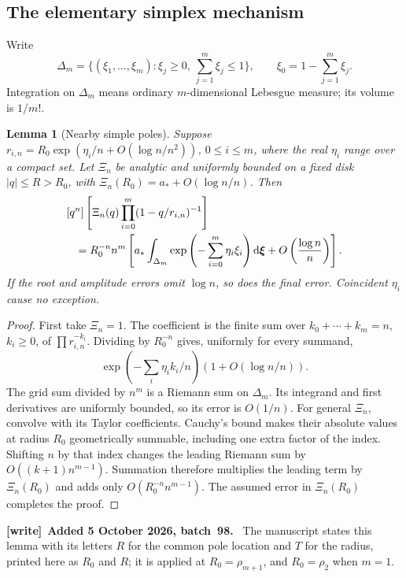 \documentclass[11pt,a4paper]{article}
\numberwithin{equation}{section}
\newtheorem{lemma}[theorem]{Lemma}
\theoremstyle{definition}\newtheorem{definition}[theorem]{Definition}
\theoremstyle{remark}\newtheorem{remark}[theorem]{Remark}
\newcommand{\coeff}[2]{[#1^{#2}]}
\newcommand{\dd}{\mathrm d}
\newenvironment{writenote}[1][]{\par\smallskip\begingroup\small
 \noindent\textbf{[write]}\if\relax\detokenize{#1}\relax\else~\textbf{#1.}\fi\ }%
 {\par\endgroup\smallskip}
\begin{document}
\subsection{The elementary simplex mechanism}
Write
\[
 \Delta_m=\{(\xi_1,\ldots,\xi_m):\xi_j\ge0,\ \textstyle\sum_{j=1}^m \xi_j\le1\},
 \qquad \xi_0=1-\sum_{j=1}^m \xi_j.
\]
Integration on $\Delta_m$ means ordinary $m$-dimensional Lebesgue measure;
its volume is $1/m!$.

\begin{lemma}[Nearby simple poles]\label{vmb:cw:lem:simplex}
Suppose $r_{i,n}=R_0\exp(\eta_i/n+O(\log n/n^2))$, $0\le i\le m$, where
the real $\eta_i$ range over a compact set. Let $\Xi_n$ be
analytic and uniformly bounded on a fixed disk $|q|\le R>R_0$, with
$\Xi_n(R_0)=a_*+O(\log n/n)$. Then
\begin{align}\label{vmb:cw:eq:simplexlemma}
 &\coeff qn\left[\Xi_n(q)\prod_{i=0}^{m}(1-q/r_{i,n})^{-1}\right]\notag\\
 &\hspace{8pt}=R_0^{-n}n^m\left[
 a_*\int_{\Delta_m}\exp\left(-\sum_{i=0}^{m}\eta_i \xi_i\right)\dd\bm \xi
 +O\left(\frac{\log n}{n}\right)\right].
\end{align}
If the root and amplitude errors omit $\log n$, so does the final error.
Coincident $\eta_i$ cause no exception.
\end{lemma}
\begin{proof}
First take $\Xi_n=1$. The coefficient is the finite sum over
$k_0+\cdots+k_m=n$, $k_i\ge0$, of $\prod r_{i,n}^{-k_i}$. Dividing by
$R_0^{-n}$ gives, uniformly for every summand,
\[
 \exp\left(-\sum_i\eta_i k_i/n\right)
 \left(1+O(\log n/n)\right).
\]
The grid sum divided by $n^m$ is a Riemann sum on $\Delta_m$. Its integrand
and first derivatives are uniformly bounded, so its error is $O(1/n)$.
For general $\Xi_n$, convolve with its Taylor coefficients. Cauchy's bound
makes their absolute values at radius $R_0$ geometrically summable, including
one extra factor of the index. Shifting $n$ by that index changes the leading
Riemann sum by $O((k+1)n^{m-1})$. Summation therefore multiplies the leading
term by $\Xi_n(R_0)$ and adds only $O(R_0^{-n}n^{m-1})$. The assumed error in
$\Xi_n(R_0)$ completes the proof.
\end{proof}

\begin{writenote}[Added 5 October 2026, batch~98]
The manuscript states this lemma with its letters $R$ for the common pole
location and $T$ for the radius, printed here as $R_0$ and $R$; it is applied
at $R_0=\rho_{m+1}$, and $R_0=\rho_2$ when $m=1$.
\end{writenote}
\end{document}
